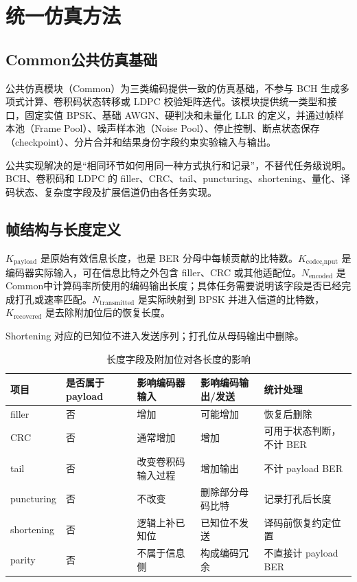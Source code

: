 \chapter{统一仿真方法}\label{chap:simulation}

\section{Common公共仿真基础}

公共仿真模块（Common）为三类编码提供一致的仿真基础，不参与 BCH 生成多项式计算、卷积码状态转移或 LDPC 校验矩阵迭代。该模块提供统一类型和接口，固定实值 BPSK、基础 AWGN、硬判决和未量化 LLR 的定义，并通过帧样本池（Frame Pool）、噪声样本池（Noise Pool）、停止控制、断点状态保存（checkpoint）、分片合并和结果身份字段约束实验输入与输出。

公共实现解决的是“相同环节如何用同一种方式执行和记录”，不替代任务级说明。BCH、卷积码和 LDPC 的 filler、CRC、tail、puncturing、shortening、量化、译码状态、复杂度字段及扩展信道仍由各任务实现。

\section{帧结构与长度定义}

$K_{\mathrm{payload}}$ 是原始有效信息长度，也是 BER 分母中每帧贡献的比特数。$K_{\mathrm{codec_input}}$ 是编码器实际输入，可在信息比特之外包含 filler、CRC 或其他适配位。$N_{\mathrm{encoded}}$ 是 Common中计算码率所使用的编码输出长度；具体任务需要说明该字段是否已经完成打孔或速率匹配。$N_{\mathrm{transmitted}}$ 是实际映射到 BPSK 并进入信道的比特数，$K_{\mathrm{recovered}}$ 是去除附加位后的恢复长度。

Shortening 对应的已知位不进入发送序列；打孔位从母码输出中删除。

\begin{table}[htbp]
  \centering
  \scriptsize
  \caption{长度字段及附加位对各长度的影响}
  \label{tab:length-field-effects}
  \begin{tabular}{p{}p{}p{}p{}p{}}
    \toprule
    项目 & 是否属于 payload & 影响编码器输入 & 影响编码输出/发送 & 统计处理 \\
    \midrule
    filler & 否 & 增加 & 可能增加 & 恢复后删除 \\
    CRC & 否 & 通常增加 & 增加 & 可用于状态判断，不计 BER \\
    tail & 否 & 改变卷积码输入过程 & 增加输出 & 不计 payload BER \\
    puncturing & 否 & 不改变 & 删除部分母码比特 & 记录打孔后长度 \\
    shortening & 否 & 逻辑上补已知位 & 已知位不发送 & 译码前恢复约定位置 \\
    parity & 否 & 不属于信息侧 & 构成编码冗余 & 不直接计 payload BER \\
    \bottomrule
  \end{tabular}
\end{table}


